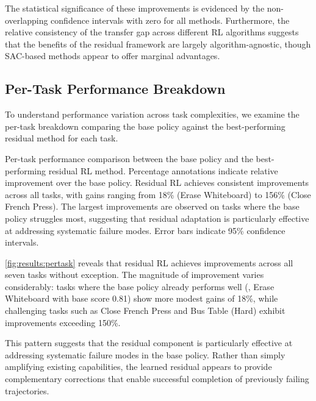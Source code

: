 The statistical significance of these improvements is evidenced by the non-overlapping confidence intervals with zero for all methods. Furthermore, the relative consistency of the transfer gap across different \ac{RL} algorithms suggests that the benefits of the residual framework are largely algorithm-agnostic, though SAC-based methods appear to offer marginal advantages.

\subsection{Per-Task Performance Breakdown}
\label{sec:results:pertask}

To understand performance variation across task complexities, we examine the per-task breakdown comparing the base policy against the best-performing residual method for each task.

{Per-task performance comparison between the base policy and the best-performing residual \ac{RL} method. Percentage annotations indicate relative improvement over the base policy. Residual \ac{RL} achieves consistent improvements across all tasks, with gains ranging from 18\% (Erase Whiteboard) to 156\% (Close French Press). The largest improvements are observed on tasks where the base policy struggles most, suggesting that residual adaptation is particularly effective at addressing systematic failure modes. Error bars indicate 95\% confidence intervals.}

\autoref{fig:results:pertask} reveals that residual \ac{RL} achieves improvements across all seven tasks without exception. The magnitude of improvement varies considerably: tasks where the base policy already performs well (\eg, Erase Whiteboard with base score 0.81) show more modest gains of 18\%, while challenging tasks such as Close French Press and Bus Table (Hard) exhibit improvements exceeding 150\%.

This pattern suggests that the residual component is particularly effective at addressing systematic failure modes in the base policy. Rather than simply amplifying existing capabilities, the learned residual appears to provide complementary corrections that enable successful completion of previously failing trajectories.

